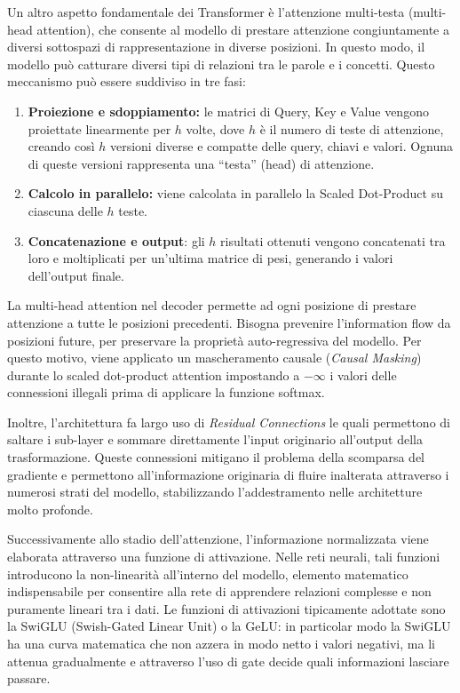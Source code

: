 Un altro aspetto fondamentale dei Transformer è l'attenzione multi-testa (multi-head attention), che consente al modello di prestare attenzione congiuntamente a diversi sottospazi di rappresentazione in diverse posizioni. In questo modo, il modello può catturare diversi tipi di relazioni tra le parole e i concetti.
Questo meccanismo può essere suddiviso in tre fasi:
\begin{enumerate}
\item \textbf{Proiezione e sdoppiamento:} le matrici di Query, Key e Value vengono proiettate linearmente per $h$ volte, dove $h$ è il numero di teste di attenzione, creando così $h$ versioni diverse e compatte delle query, chiavi e valori. Ognuna di queste versioni rappresenta una \enquote{testa} (head) di attenzione.
\item \textbf{Calcolo in parallelo:} viene calcolata in parallelo la Scaled Dot-Product su ciascuna delle $h$ teste.
\item \textbf{Concatenazione e output}: gli $h$ risultati ottenuti vengono concatenati tra loro e moltiplicati per un'ultima matrice di pesi, generando i valori dell'output finale.  
\end{enumerate}

La multi-head attention nel decoder permette ad ogni posizione di prestare attenzione a tutte le posizioni precedenti. Bisogna prevenire l'information flow da posizioni future, per preservare la proprietà auto-regressiva del modello. Per questo motivo, viene applicato un mascheramento causale (\textit{Causal Masking}) durante lo scaled dot-product attention impostando a $-\infty$ i valori delle connessioni illegali prima di applicare la funzione softmax.

Inoltre, l'architettura fa largo uso di \textit{Residual Connections} le quali permettono di saltare i sub-layer e sommare direttamente l'input originario all'output della trasformazione. Queste connessioni mitigano il problema della scomparsa del gradiente e permettono all'informazione originaria di fluire inalterata attraverso i numerosi strati del modello, stabilizzando l'addestramento nelle architetture molto profonde.

Successivamente allo stadio dell'attenzione, l'informazione normalizzata viene elaborata attraverso una funzione di attivazione. Nelle reti neurali, tali funzioni introducono la non-linearità all'interno del modello, elemento matematico indispensabile per consentire alla rete di apprendere relazioni complesse e non puramente lineari tra i dati. Le funzioni di attivazioni tipicamente adottate sono la SwiGLU (Swish-Gated Linear Unit) o la GeLU: in particolar modo la SwiGLU ha una curva matematica che non azzera in modo netto i valori negativi, ma li attenua gradualmente e attraverso l'uso di gate decide quali informazioni lasciare passare. \cite{LLama_layer}

